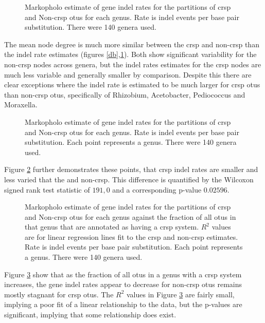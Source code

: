 \FloatBarrier
\begin{figure}[htb!]
    \caption{Markopholo estimate of gene indel rates for the partitions of \ac{crsp} and Non-\ac{crsp} \ac{otu}s for each genus. Rate is indel events per base pair substitution. There were 140 genera used.}
    \label{ib}
\end{figure}
\FloatBarrier
The mean node degree is much more similar between the \ac{crsp} and non-\ac{crsp} than the indel rate estimates (figures \ref{db},\ref{ib}).
Both show significant variability for the non-\ac{crsp} nodes across genera, but the indel rates estimates for the \ac{crsp} nodes are much less variable and generally smaller by comparison.
Despite this there are clear exceptions where the indel rate is estimated to be much larger for \ac{crsp} \ac{otu}s than non-\ac{crsp} \ac{otu}s, specifically of Rhizobium, Acetobacter, Pediococcus and Moraxella.

\FloatBarrier
\begin{figure}[htb!]
    \caption{Markopholo estimate of gene indel rates for the partitions of \ac{crsp} and Non-\ac{crsp} \ac{otu}s for each genus. Rate is indel events per base pair substitution. Each point represents a genus. There were 140 genera used.}
    \label{is}
\end{figure}
\FloatBarrier
Figure \ref{is} further demonstrates these points, that \ac{crsp} indel rates are smaller and less varied that the and non-\ac{crsp}.
This difference is quantified by the Wilcoxon signed rank test statistic of $191,0$ and a corresponding p-value $0.02596$.


\FloatBarrier
\begin{figure}[htb!]
    \caption{Markopholo estimate of gene indel rates for the partitions of \ac{crsp} and Non-\ac{crsp} \ac{otu}s for each genus against the fraction of all \ac{otu}s in that genus that are annotated as having a \ac{crsp} system. $R^2$ values are for linear regression lines fit to the \ac{crsp} and non-\ac{crsp} estimates. Rate is indel events per base pair substitution. Each point represents a genus. There were 140 genera used.}
    \label{cfrd}
\end{figure}
\FloatBarrier
Figure \ref{cfrd} show that as the fraction of all \ac{otu}s in a genus with a \ac{crsp} system increases, the gene indel rates appear to decrease for non-\ac{crsp} \ac{otu}s remains mostly stagnant for \ac{crsp} \ac{otu}s.
The $R^2$ values in Figure \ref{cfrd} are fairly small, implying a poor fit of a linear relationship to the data, but the p-values are significant, implying that some relationship does exist.

